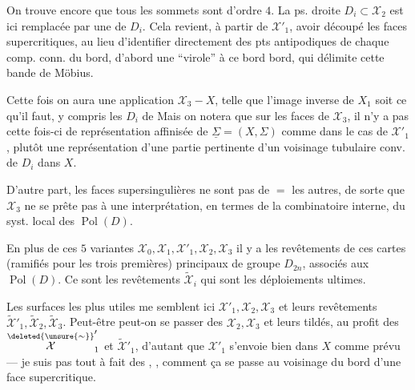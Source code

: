 On trouve encore que tous les sommets sont d'ordre $4$. La  ps. droite $D_i\subset\mathcal X_2$ est ici remplacée par une  de $D_i$. Cela revient, à partir de $\mathcal X'_1$,   avoir découpé les faces supercritiques, au lieu d'identifier directement des pts antipodiques de chaque comp. conn. du bord,   d'abord  une ``virole'' à ce bord  bord, qui délimite cette bande de Möbius.

Cette fois on aura une application $\mathcal X_3\mathbin{-}X$, telle que l'image inverse de $X_1$ soit ce qu'il faut,  y compris les $D_i$ de  Mais on notera que sur les faces  de $\mathcal X_3$, il n'y a pas cette fois-ci de représentation affinisée de $\underline\Sigma=(X,\Sigma)$ comme dans le cas de $\mathcal X'_1$,  plutôt une représentation d'une partie pertinente d'un voisinage tubulaire conv. de $D_i$ dans $X$.

D'autre part, les  faces supersingulières ne sont pas de $=$  les autres, de sorte que $\mathcal X_3$ ne se prête pas à une interprétation, en termes de la combinatoire interne, du syst. local des $\operatorname{Pol}(D)$.



En plus de ces $5$ variantes $\mathcal X_0,\mathcal X_1,\mathcal X'_1,\mathcal X_2,\mathcal X_3$ il y a  les revêtements de ces cartes (ramifiés pour les trois premières) principaux de groupe $D_{2n}$, associés aux $\operatorname{Pol}(D)$. Ce sont les revêtements $\widetilde{\mathcal X}_i$ qui sont les déploiements ultimes.

Les surfaces les plus utiles me semblent ici $\mathcal X'_1,\mathcal X_2,\mathcal X_3$ et leurs revêtements $\widetilde{\mathcal X}'_1,\widetilde{\mathcal X}_2,\widetilde{\mathcal X}_3$. Peut-être peut-on se passer des $\mathcal X_2,\mathcal X_3$ et leurs tildés, au profit des $\overset{\deleted{\unsure{\sim}}}{\mathcal X}'_1$ et $\widetilde{\mathcal X}'_1$, d'autant que $\mathcal X'_1$ s'envoie bien dans $X$ comme prévu --- je  suis pas tout à fait  des ,  , comment ça se passe au voisinage du bord d'une face supercritique.

